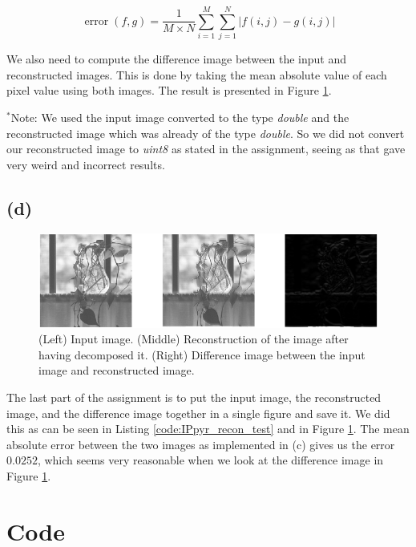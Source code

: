 \documentclass{article}
\begin{document}
\begin{equation}\label{eq:meanabserror}
    \operatorname{error}(f, g)=\frac{1}{M \times N} \sum_{i=1}^{M} \sum_{j=1}^{N}|f(i, j)-g(i, j)|
\end{equation}

We also need to compute the difference image between the input and reconstructed images. This is done by taking the mean absolute value of each pixel value using both images. The result is presented in Figure \ref{fig:recon_all}.

$^*$Note: We used the input image converted to the type \textit{double} and the reconstructed image which was already of the type \textit{double}. So we did not convert our reconstructed image to \textit{uint8} as stated in the assignment, seeing as that gave very weird and incorrect results.

\subsection*{(d)}

\begin{figure}[h]
    \centering
    \includegraphics[width=\textwidth]{Assignment_3/output_plots/IPpyr_recon_test.png}
    \caption{(Left) Input image. (Middle) Reconstruction of the image after having decomposed it. (Right) Difference image between the input image and reconstructed image.}
    \label{fig:recon_all}
\end{figure}
The last part of the assignment is to put the input image, the reconstructed image, and the difference image together in a single figure and save it. We did this as can be seen in  Listing \ref{code:IPpyr_recon_test} and in Figure \ref{fig:recon_all}. The mean absolute error between the two images as implemented in (c) gives us the error $0.0252$, which seems very reasonable when we look at the difference image in Figure \ref{fig:recon_all}.


\typeout{}


\newpage
\appendix
\section{Code}
\end{document}
